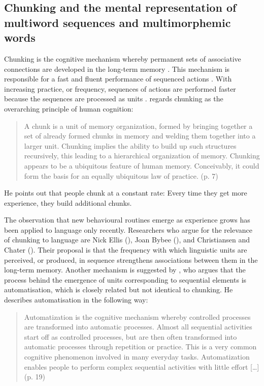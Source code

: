 \subsection{Chunking and the mental representation of multiword sequences and multimorphemic words}\label{chunking}
Chunking is the cognitive mechanism whereby permanent sets of associative connections are developed in the long-term memory \citep[][]{ellis-1996}. This mechanism is responsible for a fast and fluent performance of sequenced actions \citep{melton-1963}. With increasing practice, or frequency, sequences of actions are performed faster because the sequences are processed as units \citep{miller-1956,anderson-1982}. \citet{newell-1990} regards chunking as the overarching principle of human cognition:
\begin{quote}
A chunk is a unit of memory organization, formed by bringing together a set of already formed chunks in memory and welding them together into a larger unit. Chunking implies the ability to build up such structures recursively, this leading to a hierarchical organization of memory. Chunking appears to be a ubiquitous feature of human memory. Conceivably, it could form the basis for an equally ubiquitous law of practice. (p. 7)
\end{quote}
He points out that people chunk at a constant rate: Every time they get more experience, they build additional chunks. 

The observation that new behavioural routines emerge as experience grows has been applied to language only recently. Researchers who argue for the relevance of chunking to language are Nick Ellis (\citeyear{ellis-1996}), Joan Bybee (\citeyear{bybee-constituency-2002}), and Christiansen and Chater (\citeyear{christiansen-chater-2016}). Their proposal is that the frequency with which linguistic units are perceived, or produced, in sequence strengthens associations between them in the long-term memory. Another mechanism is suggested by \citet{diessel-toappear}, who argues that the process behind the emergence of units corresponding to sequential elements is automatisation, which is closely related but not identical to chunking. He describes automatisation in the following way: 

\begin{quote}
Automatization is the cognitive mechanism whereby controlled processes are transformed into automatic processes. Almost all sequential activities start off as controlled processes, but are then often transformed into automatic processes through repetition or practice. This is a very common cognitive phenomenon involved in many everyday tasks. Automatization enables people to perform complex sequential activities with little effort [\dots] (p. 19)
\end{quote}

